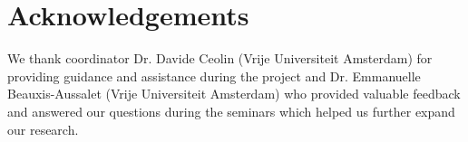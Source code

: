 \section{Acknowledgements}

We thank coordinator Dr. Davide Ceolin (Vrije Universiteit Amsterdam) for providing guidance and assistance during the project and Dr. Emmanuelle Beauxis-Aussalet (Vrije Universiteit Amsterdam) who provided valuable feedback and answered our questions during the seminars which helped us further expand our research. 